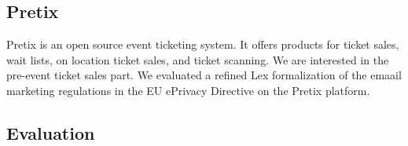 \subsection{Pretix}
Pretix is an open source event ticketing system.
It offers products for ticket sales, wait lists,
on location ticket sales, and ticket scanning.
We are interested in the pre-event ticket sales part.
We evaluated a refined Lex formalization of the emaail marketing
regulations in the EU ePrivacy Directive on the Pretix
platform.

\subsection{Evaluation}

